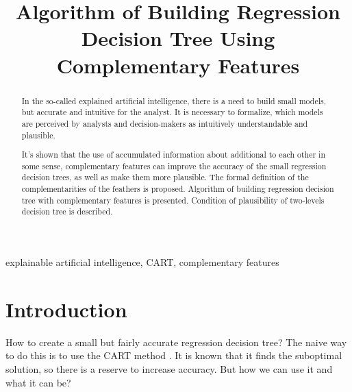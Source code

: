 \documentclass[conference]{IEEEtran}
\theoremstyle{definition}
\begin{document}
\title{Algorithm of Building Regression Decision Tree Using Complementary Features \\
}

\author{ %
}

\maketitle
\IEEEoverridecommandlockouts
{} 

\begin{abstract}
In the so-called explained artificial intelligence, there is a need to build small models, but accurate and intuitive for the analyst. It is necessary to formalize, which models are perceived by analysts and decision-makers as intuitively understandable and plausible.


It's shown that the use of accumulated information about additional to each other in some sense, complementary features can improve the accuracy of the small regression decision trees, as well as make them more plausible. The formal definition of the complementarities of the feathers is proposed. Algorithm of building regression decision tree with complementary features is presented. Condition of plausibility of two-levels decision tree is described.
\end{abstract}

\begin{IEEEkeywords}
explainable artificial intelligence, CART, complementary features
\end{IEEEkeywords}

\section{Introduction}
How to create a small but fairly accurate regression decision tree? The naive way to do this is to use the CART method \cite{cart}. It is known that it finds the suboptimal solution, so there is a reserve to increase accuracy. But how we can use it and what it can be?
\end{document}
